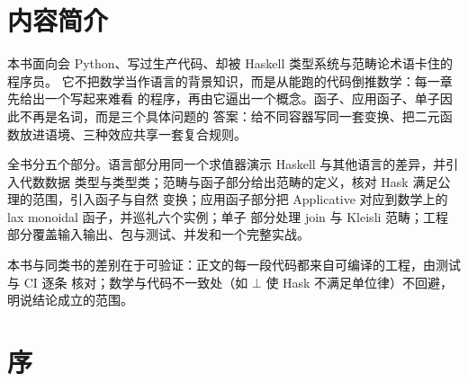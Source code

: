 \chapter*{内容简介}


本书面向会 Python、写过生产代码、却被 Haskell 类型系统与范畴论术语卡住的程序员。
它不把数学当作语言的背景知识，而是从能跑的代码倒推数学：每一章先给出一个写起来难看
的程序，再由它逼出一个概念。函子、应用函子、单子因此不再是名词，而是三个具体问题的
答案：给不同容器写同一套变换、把二元函数放进语境、三种效应共享一套复合规则。

全书分五个部分。语言部分用同一个求值器演示 Haskell 与其他语言的差异，并引入代数数据
类型与类型类；范畴与函子部分给出范畴的定义，核对 Hask 满足公理的范围，引入函子与自然
变换；应用函子部分把 Applicative 对应到数学上的 lax monoidal 函子，并巡礼六个实例；单子
部分处理 join 与 Kleisli 范畴；工程部分覆盖输入输出、包与测试、并发和一个完整实战。

本书与同类书的差别在于可验证：正文的每一段代码都来自可编译的工程，由测试与 CI 逐条
核对；数学与代码不一致处（如 $\bot$ 使 Hask 不满足单位律）不回避，明说结论成立的范围。


\chapter*{序}


